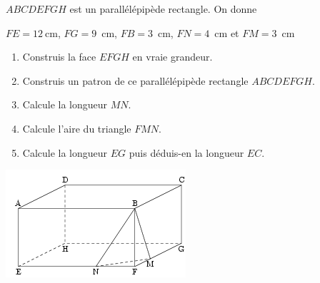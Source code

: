 
$ABCDEFGH$ est un parallélépipède rectangle. On donne

$FE=12~$cm, $FG=9$~cm,
$FB=3$~cm, $FN=4$~cm et 
$FM=3$~cm
\begin{enumerate}
\item Construis la face $EFGH$ en vraie grandeur.
\item Construis un patron de ce parallélépipède rectangle $ABCDEFGH$.
\item Calcule la longueur $MN$.
\item Calcule l'aire du triangle $FMN$.
\item Calcule la longueur $EG$ puis déduis-en la longueur $EC$.
\end{enumerate}
\includegraphics[scale=1]{RepS-exo1.png} 

